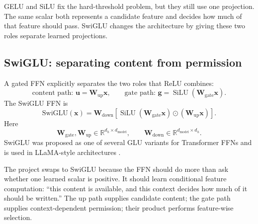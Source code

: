 \documentclass[11pt,a4paper]{article}
\theoremstyle{definition}
\theoremstyle{plain}
\newcommand{\vx}{\bm{x}}
\newcommand{\vu}{\bm{u}}
\newcommand{\vg}{\bm{g}}
\newcommand{\mW}{\bm{W}}
\newcommand{\reals}{\mathbb{R}}
\newcommand{\dmodel}{d_{\mathrm{model}}}
\DeclareMathOperator{\SiLU}{SiLU}
\begin{document}
\begin{connectionbox}
GELU and SiLU fix the hard-threshold problem, but they still use one projection. The same scalar both represents a candidate feature and decides how much of that feature should pass. SwiGLU changes the architecture by giving these two roles separate learned projections.
\end{connectionbox}

\subsection{SwiGLU: separating content from permission}

A gated FFN explicitly separates the two roles that ReLU combines:
\begin{equation}
    \text{content path: }\vu=\mW_{\mathrm{up}}\vx,
    \qquad
    \text{gate path: }\vg=\SiLU(\mW_{\mathrm{gate}}\vx).
\end{equation}
The SwiGLU FFN is
\begin{equation}\label{eq:swiglu}
    \mathrm{SwiGLU}(\vx)=
    \mW_{\mathrm{down}}\left[\SiLU(\mW_{\mathrm{gate}}\vx)\odot(\mW_{\mathrm{up}}\vx)\right].
\end{equation}
Here
\begin{equation}
    \mW_{\mathrm{gate}},\mW_{\mathrm{up}}\in\reals^{d_h\times\dmodel},
    \qquad
    \mW_{\mathrm{down}}\in\reals^{\dmodel\times d_h}.
\end{equation}
SwiGLU was proposed as one of several GLU variants for Transformer FFNs \cite{shazeer2020glu} and is used in LLaMA-style architectures \cite{touvron2023llama}.

\begin{motivationbox}
The project swaps to SwiGLU because the FFN should do more than ask whether one learned scalar is positive. It should learn conditional feature computation: ``this content is available, and this context decides how much of it should be written.'' The up path supplies candidate content; the gate path supplies context-dependent permission; their product performs feature-wise selection.
\end{motivationbox}
\end{document}
